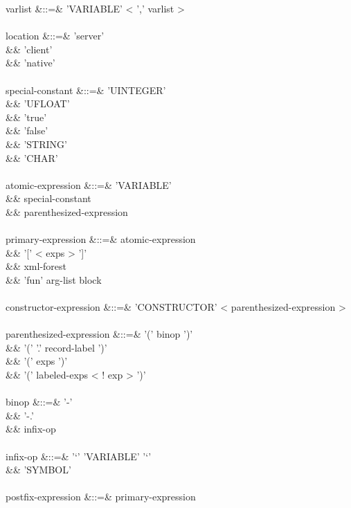 \documentclass[11pt,a4paper]{article}
\begin{document}
\begin{grammar}
varlist &::=& 'VARIABLE' < ',' varlist > \\
\\
location &::=& 'server' \\
&&             'client' \\
&&             'native' \\
\\
special-constant &::=& 'UINTEGER' \\
&&                     'UFLOAT' \\
&&                     'true' \\
&&                     'false' \\
&&                     'STRING' \\
&&                     'CHAR' \\
\\
atomic-expression &::=& 'VARIABLE' \\
&&                      special-constant \\
&&                      parenthesized-expression \\
\\
primary-expression &::=& atomic-expression \\
&&                       '[' < exps > ']' \\
&&                       xml-forest \\
&&                       'fun' arg-list block \\
\\
constructor-expression &::=& 'CONSTRUCTOR' < parenthesized-expression > \\
\\
parenthesized-expression &::=&  '(' binop ')' \\
&&                              '(' '.' record-label ')' \\
&&                              '(' exps ')' \\
&&                              '(' labeled-exps < ! exp > ')' \\
\\
binop &::=& '-' \\
&&          '-.' \\
&&          infix-op \\
\\
infix-op &::=&  '`' 'VARIABLE' '`' \\
&&              'SYMBOL' \\
\\
postfix-expression &::=&  primary-expression \\

\end{grammar}
\end{document}
